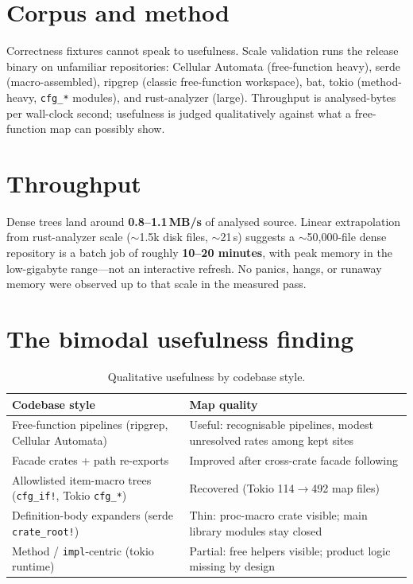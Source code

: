 \documentclass[11pt,a4paper,oneside]{report}
\begin{document}
\section{Corpus and method}

Correctness fixtures cannot speak to usefulness. Scale validation runs the
release binary on unfamiliar repositories: Cellular Automata (free-function
heavy), serde (macro-assembled), ripgrep (classic free-function workspace),
bat, tokio (method-heavy, \texttt{cfg\_*} modules), and rust-analyzer (large).
Throughput is analysed-bytes per wall-clock second; usefulness is judged
qualitatively against what a free-function map can possibly show.

\section{Throughput}

Dense trees land around \textbf{0.8--1.1\,MB/s} of analysed source. Linear
extrapolation from rust-analyzer scale ($\sim$1.5k disk files, $\sim$21\,s)
suggests a $\sim$50{,}000-file dense repository is a batch job of roughly
\textbf{10--20 minutes}, with peak memory in the low-gigabyte range---not an
interactive refresh. No panics, hangs, or runaway memory were observed up to
that scale in the measured pass.

\section{The bimodal usefulness finding}

\begin{table}[ht]
\centering
\begin{tabular}{@{}lp{7.2cm}@{}}
\toprule
\textbf{Codebase style} & \textbf{Map quality} \\
\midrule
Free-function pipelines (ripgrep, Cellular Automata) &
  Useful: recognisable pipelines, modest unresolved rates among kept sites \\
Facade crates + path re-exports &
  Improved after cross-crate facade following \\
Allowlisted item-macro trees (\texttt{cfg\_if!}, Tokio \texttt{cfg\_*}) &
  Recovered (Tokio 114$\rightarrow$492 map files) \\
Definition-body expanders (serde \texttt{crate\_root!}) &
  Thin: proc-macro crate visible; main library modules stay closed \\
Method / \texttt{impl}-centric (tokio runtime) &
  Partial: free helpers visible; product logic missing by design \\
\bottomrule
\end{tabular}
\caption{Qualitative usefulness by codebase style.}
\label{tab:usefulness}
\end{table}
\end{document}
